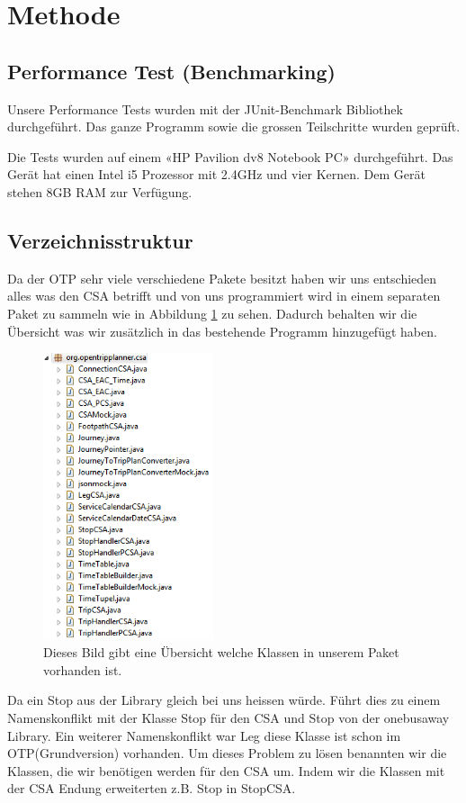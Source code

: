 \section{Methode}

\subsection{Performance Test (Benchmarking)}
Unsere Performance Tests wurden mit der JUnit-Benchmark Bibliothek durchgeführt. Das ganze Programm sowie die grossen Teilschritte wurden geprüft. 

Die Tests wurden auf einem «HP Pavilion dv8 Notebook PC» durchgeführt. Das Gerät hat einen Intel i5 Prozessor mit 2.4GHz und vier Kernen. Dem Gerät stehen 8GB RAM zur Verfügung.


\subsection{Verzeichnisstruktur}
Da der OTP sehr viele verschiedene Pakete besitzt haben wir uns entschieden alles was den CSA betrifft und von uns programmiert wird in einem separaten Paket zu sammeln wie in Abbildung \ref{fig:csapackage} zu sehen. Dadurch behalten wir die Übersicht was wir zusätzlich in das bestehende Programm hinzugefügt haben. 

\begin{figure}[h]
	\centering
	\includegraphics[width=5cm]{img/csapackage.png}
	\caption{Dieses Bild gibt eine Übersicht welche Klassen in unserem Paket vorhanden ist.}
	\label{fig:csapackage}
\end{figure}

Da ein Stop aus der Library gleich bei uns heissen würde. Führt dies zu einem Namenskonflikt mit der Klasse Stop für den CSA und Stop von der onebusaway Library. Ein weiterer Namenskonflikt war Leg diese Klasse ist schon im OTP(Grundversion) vorhanden.
Um dieses Problem zu lösen benannten wir die Klassen, die wir benötigen werden für den CSA um. Indem wir die Klassen mit der CSA Endung erweiterten z.B. Stop in StopCSA.\newline


